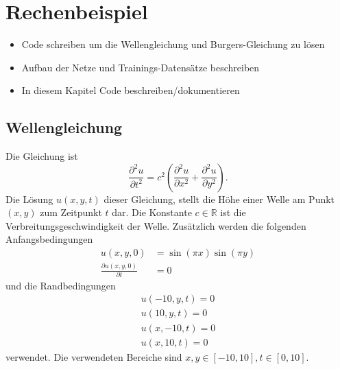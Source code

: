 %
%
%
%

\section{Rechenbeispiel\label{neuronal:section:rechenbeispiel}}

\begin{itemize}
    \item Code schreiben um die Wellengleichung und Burgers-Gleichung zu lösen
    \item Aufbau der Netze und Trainings-Datensätze beschreiben
    \item In diesem Kapitel Code beschreiben/dokumentieren
\end{itemize}

\subsection{Wellengleichung}\label{neuronal:subsection:wellengleichung}
Die Gleichung ist
\begin{equation}
    \frac{\partial^2 u}{\partial t^2} = c^2 \left( \frac{\partial^2 u}{\partial x^2} + \frac{\partial^2 u}{\partial y^2} \right).
    \label{neuronal:wellengleichung}
\end{equation}
Die Lösung \( u(x, y, t) \) dieser Gleichung, stellt die Höhe einer Welle am Punkt \( (x, y) \) zum Zeitpunkt \( t \) dar.
Die Konstante \( c \in \mathbb{R} \) ist die Verbreitungsgeschwindigkeit der Welle.
Zusätzlich werden die folgenden Anfangsbedingungen
\begin{equation}
    \begin{aligned}
        u(x, y, 0) &= \sin(\pi x) \sin(\pi y)\\
        \frac{\partial u(x, y, 0)}{\partial t} &= 0
    \end{aligned}
    \label{neuronal:initial}
\end{equation}
und die Randbedingungen
\begin{equation}
    \begin{aligned}
        u(-10, y, t) = 0\\
        u(10, y, t) = 0\\
        u(x, -10, t) = 0\\
        u(x, 10, t) = 0
    \end{aligned}
    \label{neuronal:rand}
\end{equation}
verwendet.
Die verwendeten Bereiche sind \( x, y \in [-10,10], t \in [0,10] \).


